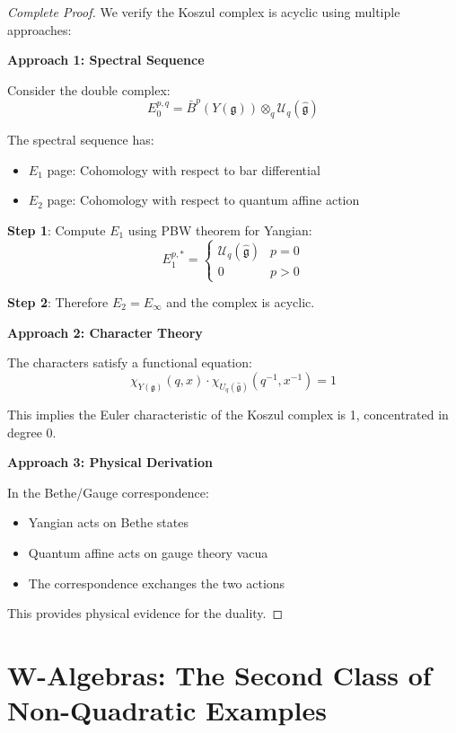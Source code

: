 \begin{proof}[Complete Proof]
We verify the Koszul complex is acyclic using multiple approaches:

\textbf{Approach 1: Spectral Sequence}

Consider the double complex:
\[
E_0^{p,q} = \bar{B}^p(Y(\mathfrak{g})) \otimes_q \mathcal{U}_q(\hat{\mathfrak{g}})
\]

The spectral sequence has:
\begin{itemize}
\item $E_1$ page: Cohomology with respect to bar differential
\item $E_2$ page: Cohomology with respect to quantum affine action
\end{itemize}

\textbf{Step 1}: Compute $E_1$ using PBW theorem for Yangian:
\[
E_1^{p,*} = \begin{cases}
\mathcal{U}_q(\hat{\mathfrak{g}}) & p = 0 \\
0 & p > 0
\end{cases}
\]

\textbf{Step 2}: Therefore $E_2 = E_\infty$ and the complex is acyclic.

\textbf{Approach 2: Character Theory}

The characters satisfy a functional equation:
\[
\chi_{Y(\mathfrak{g})}(q, x) \cdot \chi_{U_q(\hat{\mathfrak{g}})}(q^{-1}, x^{-1}) = 1
\]

This implies the Euler characteristic of the Koszul complex is 1, concentrated in degree 0.

\textbf{Approach 3: Physical Derivation}

In the Bethe/Gauge correspondence:
\begin{itemize}
\item Yangian acts on Bethe states
\item Quantum affine acts on gauge theory vacua
\item The correspondence exchanges the two actions
\end{itemize}

This provides physical evidence for the duality. \qedhere
\end{proof}


\section{W-Algebras: The Second Class of Non-Quadratic Examples}

